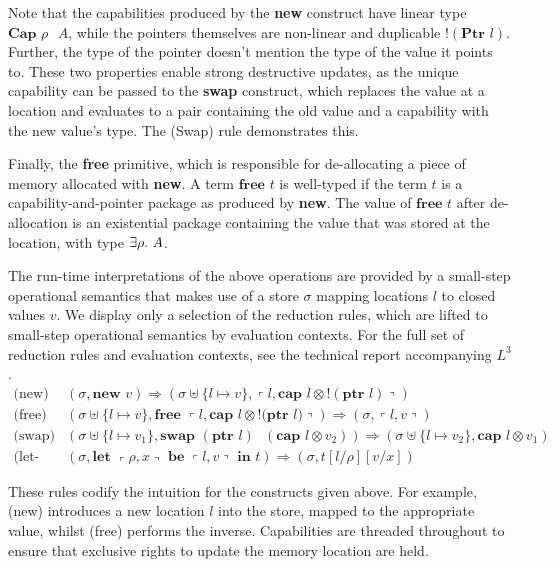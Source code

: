 \documentclass[]{unswthesis}
\newcommand{\Exists}[1]{\exists #1 \ldotp \,}
\newcommand{\letbe}[3]{\textbf{let $#1$ be $#2$ in $#3$}}
\newcommand{\Ptr}[1]{\textbf{Ptr $#1$}}
\newcommand{\ptr}[1]{\textbf{ptr $#1$}}
\newcommand{\Capa}[2]{\textbf{Cap $#1$ $#2$}}
\newcommand{\capa}[1]{\textbf{cap $#1$}}
\newcommand{\lquine}{\left\ulcorner}
\newcommand{\rquine}{\right\urcorner}
\newcommand{\lnew}[1]{\textbf{new $#1$}}
\newcommand{\lfree}[1]{\textbf{free $#1$}}
\newcommand{\lswap}[2]{\textbf{swap $#1$ $#2$}}
\newcommand{\qpair}[2]{\lquine #1, #2 \rquine}
\newcommand{\semrule}[1]{\text{(#1)}}
\let\b\textbf
\begin{document}
Note that the capabilities produced by the \b{new} construct have linear type $\Capa{\rho}{A}$, while the pointers themselves are non-linear and duplicable $!(\Ptr{l})$. Further, the type of the pointer doesn't mention the type of the value it points to. These two properties enable strong destructive updates, as the unique capability can be passed to the \b{swap} construct, which replaces the value at a location and evaluates to a pair containing the old value and a capability with the new value's type. The (Swap) rule demonstrates this.

Finally, the \b{free} primitive, which is responsible for de-allocating a piece of memory allocated with \b{new}. A term $\lfree{t}$ is well-typed if the term $t$ is a capability-and-pointer package as produced by \b{new}. The value of $\lfree{t}$ after de-allocation is an existential package containing the value that was stored at the location, with type $\Exists{\rho} A$.

The run-time interpretations of the above operations are provided by a small-step operational semantics that makes use of a store $\sigma$ mapping locations $l$ to closed values $v$. We display only a selection of the reduction rules, which are lifted to small-step operational semantics by evaluation contexts. For the full set of reduction rules and evaluation contexts, see the technical report accompanying $L^3$ \cite{l3TechReport}.
\begin{eqnarray*}
\semrule{new} & (\sigma, \lnew{v}) \Rightarrow (\sigma \uplus \{l \mapsto v\},
  \qpair{l}{\capa{l} \otimes {!(\ptr l)}})
\\
\semrule{free} & (\sigma \uplus \{l \mapsto v\}, \lfree{\qpair{l}{\capa{l} \otimes {!(\ptr{l}})}}) \Rightarrow (\sigma, \qpair{l}{v})
\\
\semrule{swap} & (\sigma \uplus \{ l \mapsto v_1 \}, \lswap{(\ptr{l})}{(\capa{l} \otimes v_2)})
  \Rightarrow (\sigma \uplus \{ l \mapsto v_2 \}, \capa{l} \otimes v_1)
\\
\semrule{let-lpack} & (\sigma, \letbe{\qpair{\rho}{x}}{\qpair{l}{v}}{t})
  \Rightarrow
  (\sigma, t[l/\rho][v/x])
\end{eqnarray*}

These rules codify the intuition for the constructs given above. For example, (new) introduces a new location $l$ into the store, mapped to the appropriate value, whilst (free) performs the inverse. Capabilities are threaded throughout to ensure that exclusive rights to update the memory location are held.
\end{document}

